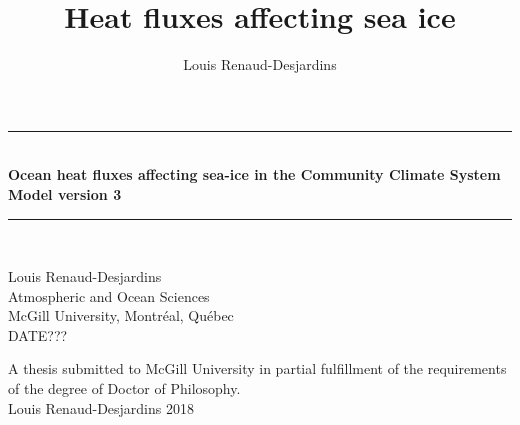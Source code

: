 \documentclass[12pt]{article}
\title{Heat fluxes affecting sea ice}
\author{Louis Renaud-Desjardins}
\begin{document}
\thispagestyle{empty}
\begin{center}
\begin{minipage}{0.75\linewidth}
    \centering
    {\LARGE \rule{\textwidth}{0.4pt} \\ \textbf{Ocean heat fluxes affecting sea-ice in the Community Climate System Model version 3} \par \rule{\textwidth}{0.4pt}\\}
    \vspace{5cm}
    {\large Louis Renaud-Desjardins  \\ Atmospheric and Ocean Sciences \\ McGill University, Montréal, Québec \\ DATE??? \par}
    \vspace{6cm}
    { A thesis submitted to McGill University in partial fulfillment of the requirements of the degree of Doctor of Philosophy. \\ \textcopyright Louis Renaud-Desjardins 2018\par}
\end{minipage}
\end{center}
\clearpage

\end{document}
